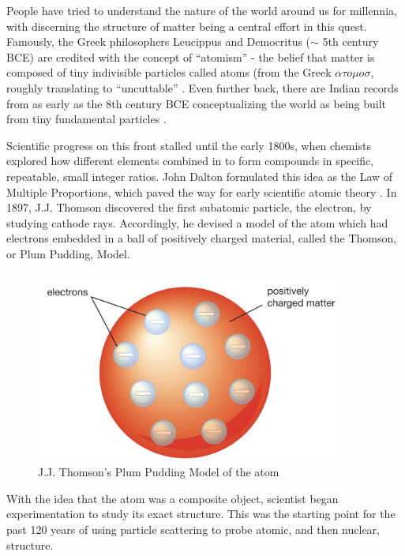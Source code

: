 
People have tried to understand the nature of the world around us for millennia, with discerning the structure of matter being a central effort in this quest. Famously, the Greek philosophers Leucippus and Democritus ($\sim$ 5th century BCE) are credited with the concept of ``atomism'' - the belief that matter is composed of tiny indivisible particles called atoms (from the Greek $\alpha \tau o \mu o \sigma$, roughly translating to ``uncuttable'' \cite{C.C.W.Taylor1999Commentary}. Even further back, there are Indian records from as early as the 8th century BCE conceptualizing the world as being built from tiny fundamental particles \cite{ThomasMcEvilley2002THePhilosophies}.

Scientific progress on this front stalled until the early 1800s, when chemists explored how different elements combined in to form compounds in specific, repeatable, small integer ratios. John Dalton formulated this idea as the Law of Multiple Proportions, which paved the way for early scientific atomic theory \cite{Britannica2010LawProportions}. In 1897, J.J. Thomson discovered the first subatomic particle, the electron, by studying cathode rays\cite{Thomson1901OnAtoms}. Accordingly, he devised a model of the atom which had electrons embedded in a ball of positively charged material, called the Thomson, or Plum Pudding, Model\cite{JaumeNavarro1995AThomson}.

\begin{figure}
    \centering
    \includegraphics[width=0.9\textwidth]{Chapters/Ch1-Intro/Ch1-Sec1-Background/pics/plumbpudding.png}
    \caption{J.J. Thomson's Plum Pudding Model of the atom \cite{Britannica2023ThomsonModel} }
    \label{fig:PlumPudding}
\end{figure}

With the idea that the atom was a composite object, scientist began experimentation to study its exact structure. This was the starting point for the past 120 years of using particle scattering to probe atomic, and then nuclear, structure. 


